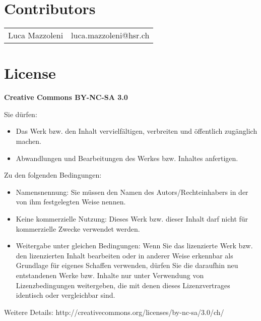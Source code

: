 \section*{Contributors}
\begin{tabular}{ll}
    Luca Mazzoleni& luca.mazzoleni@hsr.ch \\ 
\end{tabular} 

{\scriptsize 
    \section*{License}
    \textbf{Creative Commons BY-NC-SA 3.0}
    
    Sie dürfen:
    \begin{itemize}
        \item Das Werk bzw. den Inhalt vervielfältigen, verbreiten und öffentlich
        zugänglich machen.
        \item Abwandlungen und Bearbeitungen des Werkes bzw. Inhaltes anfertigen.
    \end{itemize}
    Zu den folgenden Bedingungen:
    \begin{itemize}
        \item Namensnennung: Sie müssen den Namen des Autors/Rechteinhabers in der von ihm
        festgelegten Weise nennen.
        \item Keine kommerzielle Nutzung: Dieses Werk bzw. dieser Inhalt darf nicht für
        kommerzielle Zwecke verwendet werden.
        \item  Weitergabe unter gleichen Bedingungen: Wenn Sie das lizenzierte Werk bzw. den
        lizenzierten Inhalt bearbeiten oder in anderer Weise erkennbar als Grundlage
        für eigenes Schaffen verwenden, dürfen Sie die daraufhin neu entstandenen
        Werke bzw. Inhalte nur unter Verwendung von Lizenzbedingungen weitergeben,
        die mit denen dieses Lizenzvertrages identisch oder vergleichbar sind.
    \end{itemize}
    Weitere Details: http://creativecommons.org/licenses/by-nc-sa/3.0/ch/
}
\clearpage
{}%
